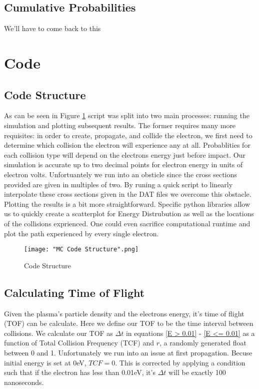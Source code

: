 \documentclass[12pt]{article}
\begin{document}
\subsection{Cumulative Probabilities}
We'll have to come back to this

\section{Code}
\subsection{Code Structure}
As can be seen in Figure \ref{Code Structure} script was split into two main processes: running the simulation and plotting subsequent 
results. The former requires many more 
requisites: in order to create, propagate, and collide the electron, we first need to determine which collision the electron will experience 
any at all. Probablities for each collision type will depend on the electrons energy just before impact. Our simulation is accurate up to 
two decimal points for electron energy in units of electron volts. Unfortuantely we run into an obsticle since the cross sections 
provided are given in multiples of two. By runing a quick script to linearly interpolate these cross sections given in the DAT files we 
overcome this obstacle. Plotting the results is a bit more straightforward. Specific python libraries allow us to quickly create a 
scatterplot for Energy Distrubution as well as the locations of the collisions exprienced. One could even sacrifice computational runtime 
and plot the path experienced by every single electron.

\begin{figure}[h]
	\centering
 	\texttt{[image: "MC Code Structure".png]}
	\caption{Code Structure}
	\label{Code Structure}
\end{figure}


\subsection{Calculating Time of Flight}
Given the plasma's particle density and the electrons energy, it's time of flight (TOF) can be calculate. Here we define our TOF to be the time interval between collisions. We calculate our TOF as $\Delta t$ in equations \ref{E > 0.01} -  
\ref{E <= 0.01} as a function of Total Collision Frequency (TCF) and $r$, a randomly generated float between 0 and 1. Unfortunately we 
run into an issue at first propagation. Becuse initial  energy is set at 0eV, $TCF = 0$. This is corrected by applying a condition such that 
if the electron has less than 0.01eV, it’s $\Delta t$ will be exactly 100 nanoseconds. 
\end{document}
